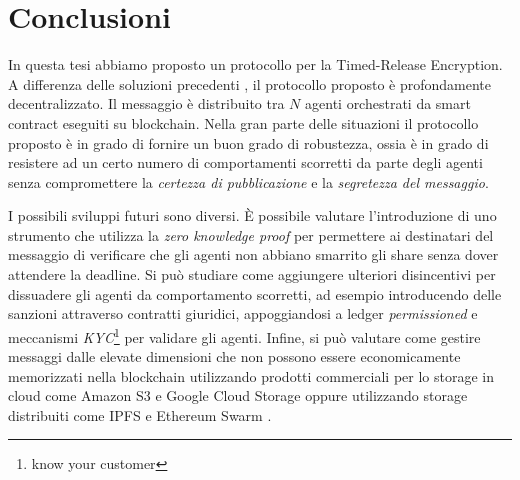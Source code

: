 \chapter{Conclusioni}
In questa tesi abbiamo proposto un protocollo per la Timed-Release Encryption. A differenza delle soluzioni precedenti \cite{time-capsule-signature, 10.1007/11602897_25, 10.1007/3-540-48910-X_6,
	10.1007/11889663_17, 10.1007/978-3-642-15317-4_1, 10.1145/1330332.1330336, chalkias2007improved},
il protocollo proposto è profondamente decentralizzato. Il messaggio è distribuito tra $ N $ agenti orchestrati da smart contract eseguiti su blockchain. Nella gran parte delle situazioni il protocollo proposto è in grado di fornire un buon grado di robustezza, ossia è in grado di resistere ad un certo numero di comportamenti scorretti da parte degli agenti senza compromettere la \textit{certezza di pubblicazione} e la \textit{segretezza del messaggio}.

I possibili sviluppi futuri sono diversi. È possibile valutare l'introduzione di uno strumento che utilizza la \textit{zero knowledge proof} per permettere ai destinatari del messaggio di verificare che gli agenti non abbiano smarrito gli share senza dover attendere la deadline. Si può studiare come aggiungere ulteriori disincentivi per dissuadere gli agenti da comportamento scorretti, ad esempio introducendo delle sanzioni attraverso contratti giuridici, appoggiandosi a ledger \textit{permissioned} e meccanismi \textit{KYC}\footnote{know your customer} per validare gli agenti. Infine, si può valutare come gestire messaggi dalle elevate dimensioni che non possono essere economicamente memorizzati nella blockchain utilizzando prodotti commerciali per lo storage in cloud come Amazon S3 \cite{amazon-s3} e Google Cloud Storage \cite{gcs} oppure utilizzando storage distribuiti come IPFS \cite{ipfs} e Ethereum Swarm \cite{ethereum-swarm}.
